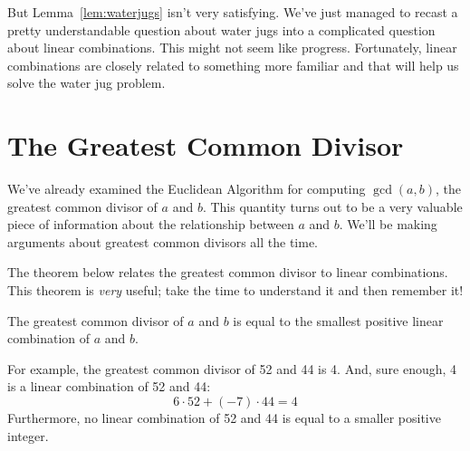 But Lemma~\ref{lem:waterjugs} isn't very satisfying.  We've just managed
to recast a pretty understandable question about water jugs into a
complicated question about linear combinations.  This might not seem like
progress.  Fortunately, linear combinations are closely related to
something more familiar and that will help us solve the water jug problem.



\section{The Greatest Common Divisor}
\label{sec:gcd}

We've already examined the Euclidean Algorithm for computing $\gcd(a, b)$,
the greatest common divisor of $a$ and $b$.  This quantity turns out to be
a very valuable piece of information about the relationship between $a$
and $b$.  We'll be making arguments about greatest common divisors all
the time.


The theorem below relates the greatest common divisor to linear
combinations.  This theorem is \emph{very} useful; take the time to
understand it and then remember it!

\begin{theorem}
\label{th:gcd}
The greatest common divisor of $a$ and $b$ is equal to the smallest
positive linear combination of $a$ and $b$.
\end{theorem}

For example, the greatest common divisor of 52 and 44 is 4.  And, sure
enough, 4 is a linear combination of 52 and 44:
%
\[
6 \cdot 52 + (-7) \cdot 44  =  4
\]
%
Furthermore, no linear combination of 52 and 44 is equal to a smaller
positive integer.


